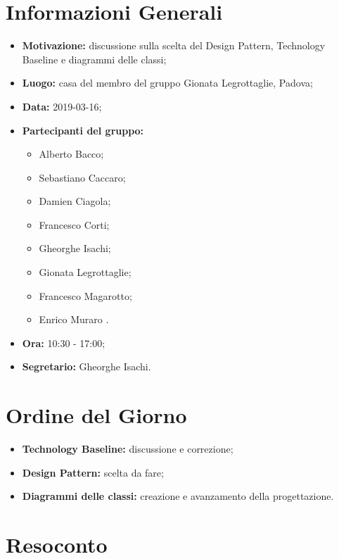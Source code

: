 \documentclass[a4paper, oneside, openany, dvipsnames, table]{article}
\begin{document}
\copertina{}


\newpage
\tableofcontents
\newpage
\section{Informazioni Generali}
\begin{itemize}
\item \textbf{Motivazione:} discussione sulla scelta del Design Pattern, Technology Baseline e diagrammi delle classi;
\item \textbf{Luogo:} casa del membro del gruppo Gionata Legrottaglie, Padova;
\item \textbf{Data:} 2019-03-16;
\item \textbf{Partecipanti del gruppo:} \hfill
	\begin{itemize}
	\item Alberto Bacco;
	\item Sebastiano Caccaro;
	\item Damien Ciagola;
 	\item Francesco Corti;
	\item Gheorghe Isachi;
	\item Gionata Legrottaglie;
	\item Francesco Magarotto;
	\item Enrico Muraro .
	\end{itemize} 
\item \textbf{Ora:} 10:30 - 17:00;
\item \textbf{Segretario:} Gheorghe Isachi.
\end{itemize}

\section{Ordine del Giorno}
\begin{itemize}
\item \textbf{Technology Baseline:} discussione e correzione;
\item \textbf{Design Pattern:} scelta da fare; 
\item \textbf{Diagrammi delle classi:} creazione e avanzamento della progettazione.
\end{itemize}

\section{Resoconto}
\end{document}
